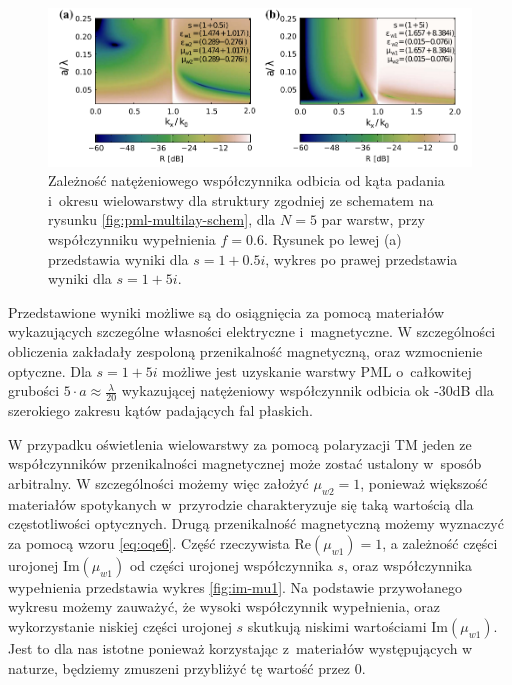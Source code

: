 \begin{figure}[tb]
	\includegraphics[width=\textwidth]{images/pml/fig3.png}
	\caption{Zależność natężeniowego współczynnika odbicia od kąta padania i~okresu wielowarstwy dla struktury zgodniej ze schematem na rysunku \ref{fig:pml-multilay-schem}, dla $N=5$ par warstw, przy współczynniku wypełnienia $f=0.6$. Rysunek po lewej (a) przedstawia wyniki dla $s=1+0.5i$, wykres po prawej przedstawia wyniki dla $s=1+5i$.}
	\label{fig:oqe3}
\end{figure}

Przedstawione wyniki możliwe są do osiągnięcia za pomocą materiałów wykazujących szczególne własności elektryczne i~magnetyczne. W szczególności obliczenia zakładały zespoloną przenikalność magnetyczną, oraz wzmocnienie optyczne. Dla $s=1+5i$ możliwe jest uzyskanie warstwy PML o~całkowitej grubości $5\cdot a \approx \frac{\lambda}{20}$ wykazującej natężeniowy współczynnik odbicia ok -30dB dla szerokiego zakresu kątów padających fal płaskich.

W przypadku oświetlenia wielowarstwy za pomocą polaryzacji TM jeden ze współczynników przenikalności magnetycznej może zostać ustalony w~sposób arbitralny. W szczególności możemy więc założyć $\mu_{w2}=1$, ponieważ większość materiałów spotykanych w~przyrodzie charakteryzuje się taką wartością dla częstotliwości optycznych. Drugą przenikalność magnetyczną możemy wyznaczyć za pomocą wzoru \ref{eq:oqe6}. Część rzeczywista $\textrm{Re}(\mu_{w1})=1$, a zależność części urojonej $\textrm{Im}(\mu_{w1})$ od części urojonej współczynnika $s$, oraz współczynnika wypełnienia przedstawia wykres \ref{fig:im-mu1}. Na podstawie przywołanego wykresu możemy zauważyć, że wysoki współczynnik wypełnienia, oraz wykorzystanie niskiej części urojonej $s$ skutkują niskimi wartościami $\textrm{Im}(\mu_{w1})$. Jest to dla nas istotne ponieważ korzystając z~materiałów występujących w naturze, będziemy zmuszeni przybliżyć tę wartość przez $0$.

